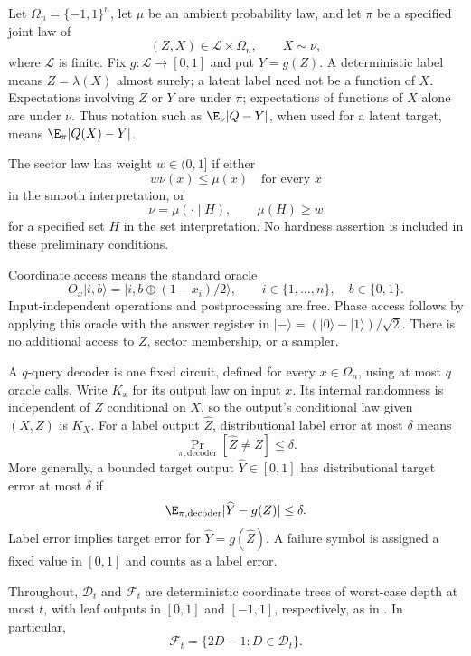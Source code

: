 \begin{definition}
\label{ian:robust-compilation-conventions}
Let \(\Omega_n=\{-1,1\}^n\), let \(\mu\) be an ambient probability law, and let \(\pi\) be a specified joint law of
\[
 (Z,X)\in\mathcal L\times\Omega_n,
 \qquad X\sim\nu,
\]
where \(\mathcal L\) is finite. Fix \(g:\mathcal L\to[0,1]\) and put \(Y=g(Z)\).
A deterministic label means \(Z=\lambda(X)\) almost surely; a latent label need not be a function of \(X\).
Expectations involving \(Z\) or \(Y\) are under \(\pi\); expectations of functions of \(X\) alone are under \(\nu\).
Thus notation such as \(\E_\nu|Q-Y|\), when used for a latent target, means \(\E_\pi|Q(X)-Y|\).

The sector law has weight \(w\in(0,1]\) if either
\[
 w\nu(x)\le\mu(x)\quad\text{for every }x
\]
in the smooth interpretation, or
\[
 \nu=\mu(\cdot\mid H),\qquad \mu(H)\ge w
\]
for a specified set \(H\) in the set interpretation.
No hardness assertion is included in these preliminary conditions.

Coordinate access means the standard oracle
\[
 O_x|i,b\rangle
 =|i,b\oplus(1-x_i)/2\rangle,
 \qquad i\in\{1,\ldots,n\},\quad b\in\{0,1\}.
\]
Input-independent operations and postprocessing are free. Phase access follows by applying this oracle with the answer register in
\(\lvert-\rangle=(\lvert0\rangle-\lvert1\rangle)/\sqrt2\).
There is no additional access to \(Z\), sector membership, or a sampler.

A \(q\)-query decoder is one fixed circuit, defined for every \(x\in\Omega_n\), using at most \(q\) oracle calls.
Write \(K_x\) for its output law on input \(x\).
Its internal randomness is independent of \(Z\) conditional on \(X\), so the output's conditional law given \((X,Z)\) is \(K_X\).
For a label output \(\widehat Z\), distributional label error at most \(\delta\) means
\[
 \Pr_{\pi,\mathrm{decoder}}[\widehat Z\ne Z]\le\delta.
\]
More generally, a bounded target output \(\widehat Y\in[0,1]\) has distributional target error at most \(\delta\) if
\[
 \E_{\pi,\mathrm{decoder}}|\widehat Y-g(Z)|\le\delta.
\]
Label error implies target error for \(\widehat Y=g(\widehat Z)\).
A failure symbol is assigned a fixed value in \([0,1]\) and counts as a label error.
\end{definition}

Throughout, \(\mathcal D_t\) and \(\mathcal F_t\) are deterministic coordinate trees of worst-case depth at most \(t\), with leaf outputs in \([0,1]\) and \([-1,1]\), respectively, as in
.
In particular,
\[
 \mathcal F_t=\{2D-1:D\in\mathcal D_t\}.
\]

